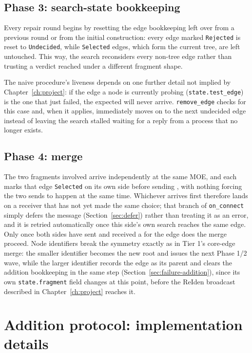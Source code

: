 \subsection{Phase 3: search-state bookkeeping}\label{sec:phase3-impl}

Every repair round begins by resetting the edge bookkeeping left over from a previous
round or from the initial construction: every edge marked \texttt{Rejected} is reset to
\texttt{Undecided}, while \texttt{Selected} edges, which form the current tree, are left
untouched. This way, the search reconsiders every non-tree edge rather than trusting a
verdict reached under a different fragment shape.

The naive procedure's liveness depends on one further detail not implied by
Chapter~\ref{ch:project}: if the edge a node is currently probing
(\texttt{state.test\_edge}) is the one that just failed, the expected 
will never arrive. \texttt{remove\_edge} checks for this case and, when it applies,
immediately moves on to the next undecided edge instead of leaving the search stalled
waiting for a reply from a process that no longer exists.

\subsection{Phase 4: merge}\label{sec:phase4-impl}

The two fragments involved arrive independently at the same MOE, and each marks that edge
\texttt{Selected} on its own side before sending , with nothing forcing the
two sends to happen at the same time. Whichever  arrives first therefore
lands on a receiver that has not yet made the same choice; that branch of
\texttt{on\_connect} simply defers the message (Section~\ref{sec:defer}) rather than
treating it as an error, and it is retried automatically once this side's own search
reaches the same edge. Only once both sides have sent and received a  for the
edge does the merge proceed. Node identifiers break the symmetry exactly as in Tier 1's
core-edge merge: the smaller identifier becomes the new root and issues the next Phase 1/2
wave, while the larger identifier records the edge as its parent and clears the addition
bookkeeping in the same step (Section~\ref{sec:failure-addition}), since its own
\texttt{state.fragment} field changes at this point, before the ReIden broadcast described
in Chapter~\ref{ch:project} reaches it.


\section{Addition protocol: implementation details}

